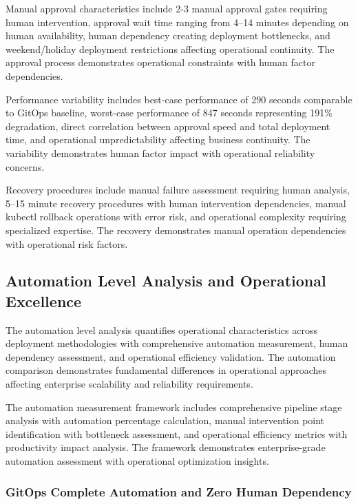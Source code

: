 Manual approval characteristics include 2-3 manual approval gates requiring human intervention, approval wait time ranging from 4--14 minutes depending on human availability, human dependency creating deployment bottlenecks, and weekend/holiday deployment restrictions affecting operational continuity. The approval process demonstrates operational constraints with human factor dependencies.

Performance variability includes best-case performance of 290 seconds comparable to GitOps baseline, worst-case performance of 847 seconds representing 191\% degradation, direct correlation between approval speed and total deployment time, and operational unpredictability affecting business continuity. The variability demonstrates human factor impact with operational reliability concerns.

Recovery procedures include manual failure assessment requiring human analysis, 5--15 minute recovery procedures with human intervention dependencies, manual kubectl rollback operations with error risk, and operational complexity requiring specialized expertise. The recovery demonstrates manual operation dependencies with operational risk factors.


\subsection{Automation Level Analysis and Operational Excellence}
\label{subsec:automation_analysis}

The automation level analysis quantifies operational characteristics across deployment methodologies with comprehensive automation measurement, human dependency assessment, and operational efficiency validation. The automation comparison demonstrates fundamental differences in operational approaches affecting enterprise scalability and reliability requirements.

The automation measurement framework includes comprehensive pipeline stage analysis with automation percentage calculation, manual intervention point identification with bottleneck assessment, and operational efficiency metrics with productivity impact analysis. The framework demonstrates enterprise-grade automation assessment with operational optimization insights.

\subsubsection{GitOps Complete Automation and Zero Human Dependency}


